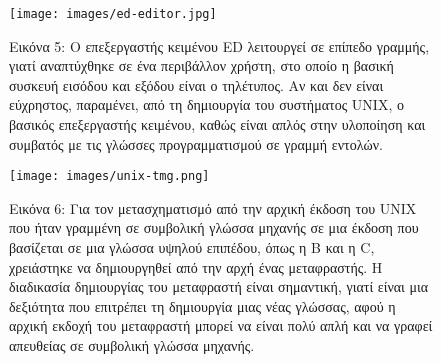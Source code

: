 \documentclass[
]{article}
\begin{document}
\leavevmode{}%
\begin{figure}
\hypertarget{fig:ed-editor}{%
\centering
\texttt{[image: images/ed-editor.jpg]}
\caption{Εικόνα 5: Ο επεξεργαστής κειμένου ED λειτουργεί σε επίπεδο
γραμμής, γιατί αναπτύχθηκε σε ένα περιβάλλον χρήστη, στο οποίο η βασική
συσκευή εισόδου και εξόδου είναι ο τηλέτυπος. Αν και δεν είναι
εύχρηστος, παραμένει, από τη δημιουργία του συστήματος UNIX, ο βασικός
επεξεργαστής κειμένου, καθώς είναι απλός στην υλοποίηση και συμβατός με
τις γλώσσες προγραμματισμού σε γραμμή εντολών.}\label{fig:ed-editor}
}
\end{figure}

\leavevmode{}%
\begin{figure}
\hypertarget{fig:unix-tmg}{%
\centering
\texttt{[image: images/unix-tmg.png]}
\caption{Εικόνα 6: Για τον μετασχηματισμό από την αρχική έκδοση του UNIX
που ήταν γραμμένη σε συμβολική γλώσσα μηχανής σε μια έκδοση που
βασίζεται σε μια γλώσσα υψηλού επιπέδου, όπως η B και η C, χρειάστηκε να
δημιουργηθεί από την αρχή ένας μεταφραστής. Η διαδικασία δημιουργίας του
μεταφραστή είναι σημαντική, γιατί είναι μια δεξιότητα που επιτρέπει τη
δημιουργία μιας νέας γλώσσας, αφού η αρχική εκδοχή του μεταφραστή μπορεί
να είναι πολύ απλή και να γραφεί απευθείας σε συμβολική γλώσσα
μηχανής.}\label{fig:unix-tmg}
}
\end{figure}
\end{document}
